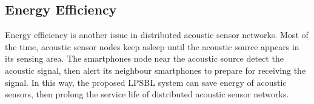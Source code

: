 \subsection{Energy Efficiency}

Energy efficiency is another issue in distributed acoustic sensor networks.
Most of the time, acoustic sensor nodes keep asleep until the acoustic source appears in its sensing area.  
The smartphones node near the acoustic source detect the acoustic signal, then alert its neighbour smartphones to prepare for receiving the signal.
In this way, the proposed LPSBL system can save energy of acoustic sensors, then prolong the service life of distributed acoustic sensor networks.







